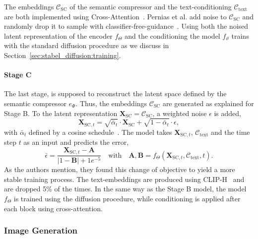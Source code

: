 The embeddings $\mathcal{C}_{\text{SC}}$ of the semantic compressor and the
text-conditioning $\mathcal{C}_{\text{text}}$ are both implemented using Cross-Attention~\cite{vaswani2023attentionneed}.
Pernias et al. add noise to $\mathcal{C}_{\text{SC}}$ and randomly drop it to
sample with classifier-free-guidance~\cite{ho2022classifierfreediffusionguidance}.
Using both the noised latent representation of the encoder $f_\Theta$ and the
conditioning the model $f_\vartheta$ trains with the standard diffusion
procedure as we discuss in Section~\ref{sec:stabel_diffusion:training}.

\paragraph*{Stage C} The last stage, is supposed to reconstruct the latent space
defined by the semantic compressor $e_\Phi$. Thus, the embeddings
$\mathcal{C}_{\text{SC}}$ are generated as explained for Stage B. To the latent
representation $\boldsymbol{X}_{\text{SC}} = \mathcal{C}_{\text{SC}}$, a weighted noise $\epsilon$
is added,
\begin{equation}
    \boldsymbol{X}_{\text{SC}, t} = \sqrt{\bar{\alpha}_t}\cdot\boldsymbol{X}_{\text{SC}}+\sqrt{1-\bar{\alpha}_t}\cdot\epsilon,
\end{equation}
with $\bar{\alpha}_t$ defined by a cosine schedule~\cite{Nichol2021ImprovedDenoisingDiffusionProbabilisticModels}.
The model takes $\boldsymbol{X}_{\text{SC}, t}$, $\mathcal{C}_{\text{text}}$ and
the time step $t$ as an input and predicts the error,
\begin{equation}
    \bar{\epsilon} = \frac{\boldsymbol{X}_{\text{SC}, t} - \boldsymbol{A}}{|1-\boldsymbol{B}| + 1e^{-5}} \quad \text{with} \quad \boldsymbol{A}, \boldsymbol{B} = f_\Theta(\boldsymbol{X}_{\text{SC}, t},\mathcal{C}_{\text{text}}, t).
\end{equation}
As the authors mention, they found this change of objective to yield a more
stable training process. The text-embeddings are produced using
CLIP-H~\cite{Ilharco2021OpenCLIP} and are dropped 5\% of the times. In the same
way as the Stage B model, the model $f_\Theta$ is trained using the diffusion
procedure, while conditioning is applied after each block using cross-attention.

\subsubsection{Image Generation}

